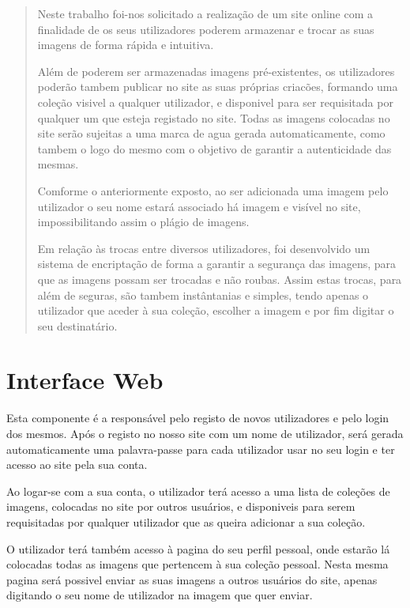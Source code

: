 \documentclass{report}
\begin{document}
\renewcommand{\abstractname}{OBJETIVOS DO PROJETO}
\begin{abstract}

Neste trabalho foi-nos solicitado a realização de um site online com a finalidade de os seus utilizadores poderem armazenar e trocar as suas imagens de forma rápida e intuitiva. 

Além de poderem ser armazenadas imagens pré-existentes, os utilizadores poderão tambem publicar no site as suas próprias criacões, formando uma coleção visivel a qualquer utilizador, e disponivel para ser requisitada por qualquer um que esteja registado no site.
Todas as imagens colocadas no site serão sujeitas a uma marca de agua gerada automaticamente, como tambem o logo do mesmo com o objetivo de garantir a autenticidade das mesmas.

Comforme o anteriormente exposto, ao ser adicionada uma imagem pelo utilizador o seu nome estará associado há imagem e visível no site, impossibilitando assim o plágio de imagens.

Em relação às trocas entre diversos utilizadores, foi desenvolvido um sistema de encriptação de forma a garantir a segurança das imagens, para que as imagens possam ser trocadas e não roubas. Assim estas trocas, para além de seguras, são tambem instântanias e simples, tendo apenas o utilizador que aceder à sua coleção, escolher a imagem e por fim digitar o seu destinatário.

\end{abstract}


\section{Interface Web}
Esta componente é a responsável pelo registo de novos utilizadores e pelo login dos mesmos. Após o registo no nosso site com um nome de utilizador, será gerada automaticamente uma palavra-passe para cada utilizador usar no seu login e ter acesso ao site pela sua conta.

Ao logar-se com a sua conta, o utilizador terá acesso a uma lista de coleções de imagens, colocadas no site por outros usuários, e disponiveis para serem requisitadas por qualquer utilizador que as queira adicionar a sua coleção. 

O utilizador terá também acesso à pagina do seu perfil pessoal, onde estarão lá colocadas todas as imagens que pertencem à sua coleção pessoal. Nesta mesma pagina será possivel enviar as suas imagens a outros usuários do site, apenas digitando o seu nome de utilizador na imagem que quer enviar. 
\end{document}
